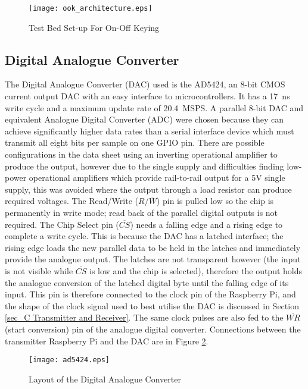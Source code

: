 \documentclass[../main.tex]{subfiles}
\begin{document}
\begin{figure}[ht]
	\centering
	\texttt{[image: ook\_architecture.eps]}
	\caption{Test Bed Set-up For On-Off Keying}
	\label{fig_OOK Architecture}
\end{figure}

\subsection{Digital Analogue Converter}

The Digital Analogue Converter (DAC) used is the AD5424, an 8-bit CMOS current output DAC with an easy interface to microcontrollers.
It has a \SI{17}{\nano\second} write cycle and a maximum update rate of \SI{20.4}{MSPS}. %
A parallel 8-bit DAC and equivalent Analogue Digital Converter (ADC) were chosen because they can achieve significantly higher data rates than a serial interface device which must transmit all eight bits per sample on one GPIO pin.
There are possible configurations in the data sheet using an inverting operational amplifier to produce the output, however due to the single supply and difficulties finding low-power operational amplifiers which provide rail-to-rail output for a 5V single supply, this was avoided where the output through a load resistor can produce required voltages.
The Read/Write ($R/\overline{W}$) pin is pulled low so the chip is permanently in write mode; read back of the parallel digital outputs is not required.
The Chip Select pin ($\overline{CS}$) needs a falling edge and a rising edge to complete a write cycle.
This is because the DAC has a latched interface; the rising edge loads the new parallel data to be held in the latches and immediately provide the analogue output.
The latches are not transparent however (the input is not visible while $\overline{CS}$ is low and the chip is selected), therefore the output holds the analogue conversion of the latched digital byte until the falling edge of its input.
This pin is therefore connected to the clock pin of the Raspberry Pi, and the shape of the clock signal used to best utilise the DAC is discussed in Section \ref{sec_C Transmitter and Receiver}.
The same clock pulses are also fed to the $\overline{WR}$ (start conversion) pin of the analogue digital converter.
Connections between the transmitter Raspberry Pi and the DAC are in Figure \ref{fig_DAC Layout}.\\

\begin{figure}[ht]
	\centering
	\texttt{[image: ad5424.eps]}
	\caption{Layout of the Digital Analogue Converter}
	\label{fig_DAC Layout}
\end{figure}
\end{document}
